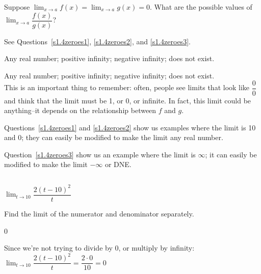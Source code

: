 \begin{question}Suppose $\displaystyle\lim_{x \rightarrow a}f(x)=\displaystyle\lim_{x \rightarrow a}g(x)=0$. What are the possible values of
$\displaystyle\lim_{x \rightarrow a}\dfrac{f(x)}{g(x)}$?
\end{question}
\begin{hint} See Questions~\ref{s1.4zeroes1}, \ref{s1.4zeroes2}, and \ref{s1.4zeroes3}.
\end{hint}
\begin{answer} Any real number; positive infinity; negative infinity; does not exist.
\end{answer}
\begin{solution}
Any real number; positive infinity; negative infinity; does not exist.\\

This is an important thing to remember: often, people see limits that look like $\dfrac{0}{0}$ and think that the limit must be 1, or 0, or infinite. In fact, this limit could be anything--it depends on the relationship between $f$ and $g$.

Questions~\ref{s1.4zeroes1} and \ref{s1.4zeroes2} show us examples where the limit is 10 and 0; they can easily be modified to make the limit any real number.

Question~\ref{s1.4zeroes3} show us  an example where the limit is $\infty$; it can easily be modified to make the limit $-\infty$ or DNE.
\end{solution}


\subsection*{\Procedural}


\begin{question}\label{s1.4firstlimit}
$\displaystyle\lim_{t \rightarrow 10} \dfrac{2(t-10)^2}{t}$
\end{question}
\begin{hint} Find the limit of the numerator and denominator separately.
\end{hint}
\begin{answer} 0
\end{answer}
\begin{solution}
Since we're not trying to divide by 0, or multiply by infinity:$\displaystyle\lim_{t \rightarrow 10} \dfrac{2(t-10)^2}{t}
=
\dfrac{2\cdot0}{10}=0$
\end{solution}

